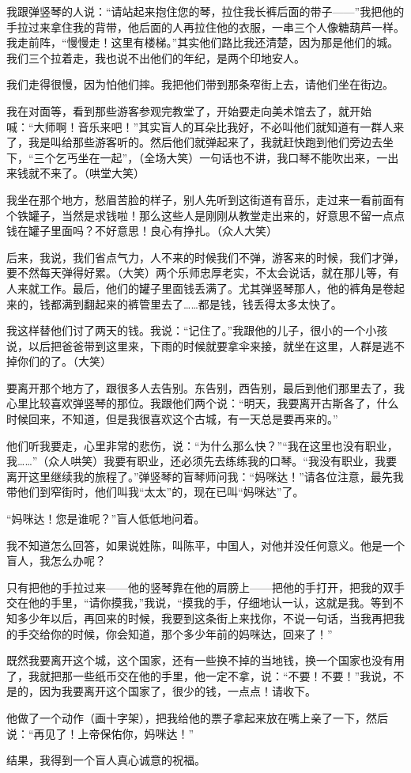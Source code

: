 \par 我跟弹竖琴的人说：“请站起来抱住您的琴，拉住我长裤后面的带子——”我把他的手拉过来拿住我的背带，他后面的人再拉住他的衣服，一串三个人像糖葫芦一样。我走前阵，“慢慢走！这里有楼梯。”其实他们路比我还清楚，因为那是他们的城。我们三个拉着走，我也说不出他们的年纪，是两个印地安人。
\par 我们走得很慢，因为怕他们摔。我把他们带到那条窄街上去，请他们坐在街边。
\par 我在对面等，看到那些游客参观完教堂了，开始要走向美术馆去了，就开始喊：“大师啊！音乐来吧！”其实盲人的耳朵比我好，不必叫他们就知道有一群人来了，我是叫给那些游客听的。然后他们就弹起来了，我就赶快跑到他们旁边去坐下，“三个乞丐坐在一起”，（全场大笑）一句话也不讲，我口琴不能吹出来，一出来钱就不来了。（哄堂大笑）
\par 我坐在那个地方，愁眉苦脸的样子，别人先听到这街道有音乐，走过来一看前面有个铁罐子，当然是求钱啦！那么这些人是刚刚从教堂走出来的，好意思不留一点点钱在罐子里面吗？不好意思！良心有挣扎。（众人大笑）
\par 后来，我说，我们省点气力，人不来的时候我们不弹，游客来的时候，我们才弹，要不然每天弹得好累。（大笑）两个乐师忠厚老实，不太会说话，就在那儿等，有人来就工作。最后，他们的罐子里面钱丢满了。尤其弹竖琴那人，他的裤角是卷起来的，钱都满到翻起来的裤管里去了……都是钱，钱丢得太多太快了。
\par 我这样替他们讨了两天的钱。我说：“记住了。”我跟他的儿子，很小的一个小孩说，以后把爸爸带到这里来，下雨的时候就要拿伞来接，就坐在这里，人群是逃不掉你们的了。（大笑）
\par 要离开那个地方了，跟很多人去告别。东告别，西告别，最后到他们那里去了，我心里比较喜欢弹竖琴的那位。我跟他们两个说：“明天，我要离开古斯各了，什么时候回来，不知道，但是我很喜欢这个古城，有一天总是要再来的。”
\par 他们听我要走，心里非常的悲伤，说：“为什么那么快？”“我在这里也没有职业，我……”（众人哄笑）我要有职业，还必须先去练练我的口琴。“我没有职业，我要离开这里继续我的旅程了。”弹竖琴的盲琴师问我：“妈咪达！”请各位注意，最先我带他们到窄街时，他们叫我“太太”的，现在已叫“妈咪达”了。
\par “妈咪达！您是谁呢？”盲人低低地问着。
\par 我不知道怎么回答，如果说姓陈，叫陈平，中国人，对他并没任何意义。他是一个盲人，我怎么办呢？
\par 只有把他的手拉过来——他的竖琴靠在他的肩膀上——把他的手打开，把我的双手交在他的手里，“请你摸我，”我说，“摸我的手，仔细地认一认，这就是我。等到不知多少年以后，再回来的时候，我要到这条街上来找你，不说一句话，当我再把我的手交给你的时候，你会知道，那个多少年前的妈咪达，回来了！”
\par 既然我要离开这个城，这个国家，还有一些换不掉的当地钱，换一个国家也没有用了，我就把那一些纸币交在他的手里，他一定不拿，说：“不要！不要！”我说，不是的，因为我要离开这个国家了，很少的钱，一点点！请收下。
\par 他做了一个动作（画十字架），把我给他的票子拿起来放在嘴上亲了一下，然后说：“再见了！上帝保佑你，妈咪达！”
\par 结果，我得到一个盲人真心诚意的祝福。
